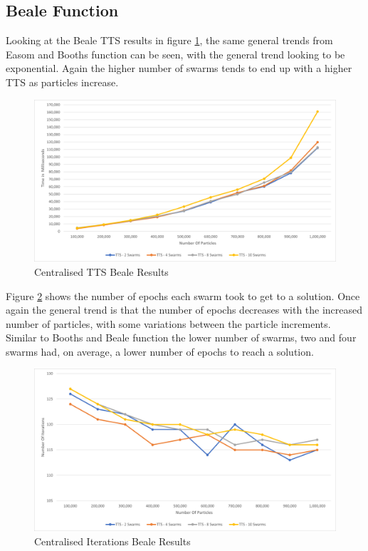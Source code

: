 \documentclass[oneside,12pt]{book}
\begin{document}
\subsection{Beale Function}

Looking at the Beale TTS results in figure \ref{fig:Centralised_TTS_Beale_Results}, the same general trends from Easom and Booths function can be seen, with the general trend looking to be exponential. Again the higher number of swarms tends to end up with a higher TTS as particles increase. 

\begin{figure}[H]
    \centering
    \includegraphics[scale=0.45]{Images/Graphs/CentralisedBealeTTS.png}
    \caption{Centralised TTS Beale Results}
    \label{fig:Centralised_TTS_Beale_Results}
\end{figure}

Figure \ref{fig:Centralised_Epoc_Beale_Results} shows the number of epochs each swarm took to get to a solution. Once again the general trend is that the number of epochs decreases with the increased number of particles, with some variations between the particle increments. Similar to Booths and Beale function the lower number of swarms, two and four swarms had, on average, a lower number of epochs to reach a solution.  

\begin{figure}[H]
    \centering
    \includegraphics[scale=0.45]{Images/Graphs/CentralisedBealeEpoch.png}
    \caption{Centralised Iterations Beale Results}
    \label{fig:Centralised_Epoc_Beale_Results}
\end{figure}
\end{document}
